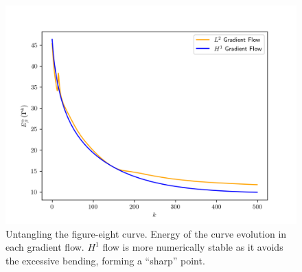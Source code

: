\documentclass[../dissertation.tex]{subfiles}
\begin{document}
\begin{figure}[tbp]
    \centering
    \includegraphics[width=\textwidth]{sections/unknottingCurveImgs/GradientFlowEnergies}
    \caption{Untangling the figure-eight curve. Energy of the curve evolution in each gradient flow. $H^1$ flow is more numerically stable as it avoids the excessive bending, forming a ``sharp'' point.}
    \label{fig: Gradient Flow Energies}
\end{figure}
\end{document}
